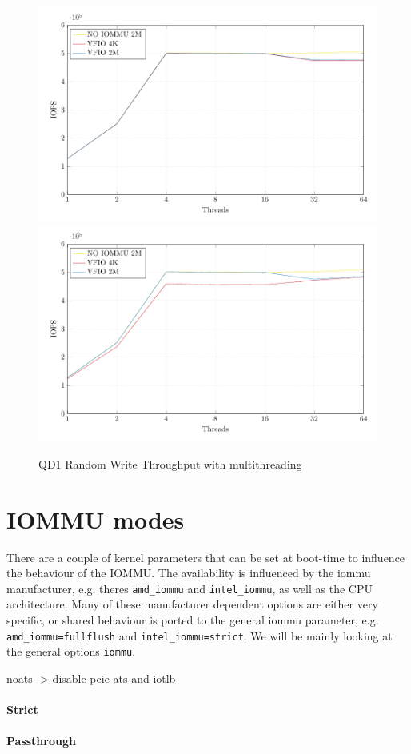 \begin{figure}
    \centering
     {\includegraphics[width=\textwidth]{figures/qd1tn_1page} \label{fig:qd1tn-1page}}
     {\includegraphics[width=\textwidth]{figures/qd1tn_512page} \label{fig:qd1tn-512page}}
    \caption{QD1 Random Write Throughput with multithreading}
    \label{fig:qd1tn}
\end{figure}

\section{IOMMU modes}
There are a couple of kernel parameters that can be set at boot-time to influence the behaviour of the IOMMU. The availability is influenced by the iommu manufacturer, e.g. theres \texttt{amd\_iommu} and \texttt{intel\_iommu}, as well as the CPU architecture. Many of these manufacturer dependent options are either very specific, or shared behaviour is ported to the general iommu parameter, e.g. \texttt{amd\_iommu=fullflush} and \texttt{intel\_iommu=strict}. We will be mainly looking at the general options \texttt{iommu}.

noats -> disable pcie ats and iotlb

\paragraph{Strict}

\paragraph{Passthrough}